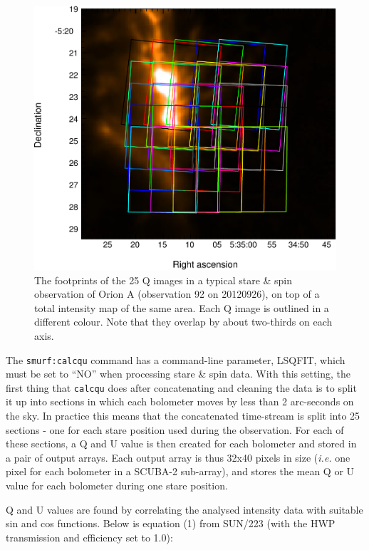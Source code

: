 \documentclass[twoside,11pt]{starlink}
\begin{document}
\begin{figure}
\includegraphics[width=\columnwidth]{stare}
\caption{The footprints of the 25 Q images in a typical stare \& spin
observation of Orion A (observation 92 on 20120926), on top of a total
intensity map of the same area. Each Q image is outlined in a different
colour. Note that they overlap by about two-thirds on each axis.}
\label{fig:stare}
\end{figure}

The \texttt{smurf:calcqu} command has a command-line parameter, LSQFIT,
which must be set to ``NO'' when processing stare \& spin data. With this
setting, the first thing that \texttt{calcqu} does after concatenating and
cleaning the data is to split it up into sections in which each bolometer
moves by less than 2 arc-seconds on the sky. In practice this means that
the concatenated time-stream is split into 25 sections - one for each
stare position used during the observation. For each of these sections, a
Q and U value is then created for each bolometer and stored in a pair of
output arrays. Each output array is thus 32x40 pixels in size (\emph{i.e.}
one pixel for each bolometer in a SCUBA-2 sub-array), and stores the mean Q or
U value for each bolometer during one stare position.

Q and U values are found by correlating the analysed intensity data with
suitable sin and cos functions. Below is equation (1) from SUN/223
 (with the
HWP transmission and efficiency set to 1.0):
\end{document}
